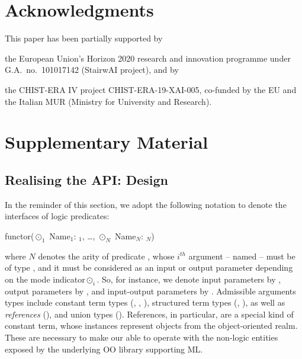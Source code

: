 \documentclass[runningheads]{llncs}
\begin{document}
\section*{Acknowledgments}
This paper has been partially supported by
	\begin{inlinelist}
		\item the European Union's Horizon 2020 research and innovation programme under G.A.\ no.\ 101017142 (StairwAI project), and by
		\item the CHIST-ERA IV project CHIST-ERA-19-XAI-005, co-funded by the EU and the Italian MUR (Ministry for University and Research).
	\end{inlinelist}





\newpage

\appendix

\section{Supplementary Material}

\subsection{Realising the API: \mllib{} Design}
\label{sec:project}

%
In the reminder of this section, we adopt the following notation to denote the interfaces of logic predicates:
%
\begin{lp}
    functor($\odot_1$ Name$_1$: $_1$, \ldots, $\odot_N$ Name$_N$: $_N$)
\end{lp}
%
where $N$ denotes the arity of predicate , whose $i^{th}$ argument -- named  -- must be of type , and it must be considered as an input or output parameter depending on the mode indicator\footnotemark $\odot_i$.
%
%
So, for instance, we denote input parameters by \pl{+}, output parameters by \pl{-}, and input-output parameters by .
%
Admissible arguments types include constant term types (, , ), structured term types (, ), as well as \emph{references} (), and union types ().
%
References, in particular, are a special kind of constant term, whose instances represent objects from the object-oriented realm.
%
These are necessary to make our \mllib{} able to operate with the non-logic entities exposed by the underlying OO library supporting ML.
\end{document}
